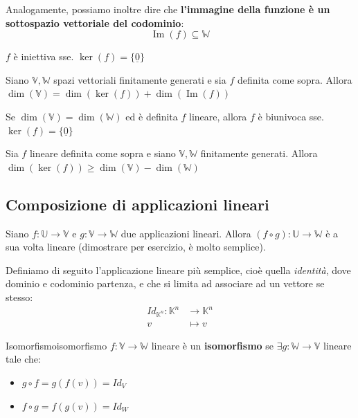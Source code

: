 \documentclass[12pt]{report}
\newcommand{\K}{\mathbb{K}}
\newcommand{\V}{\mathbb{V}}
\newcommand{\W}{\mathbb{W}}
\newcommand{\vectorspace}[1]{\mathbb{#1}}
\newcommand{\nullvector}{\underline{0}}
\begin{document}
	Analogamente, possiamo inoltre dire che \textbf{l'immagine della funzione è un sottospazio vettoriale del codominio}:
	\[
	\operatorname{Im}(f) \subseteq \W
	\]
	
	\begin{proposizione}{}{}
		$f$ è iniettiva sse. $\ker(f) = \{\nullvector\}$
	\end{proposizione}
	
	\begin{proposizione}{}{}
		Siano $\V, \W$ spazi vettoriali finitamente generati e sia $f$ definita come sopra.
		Allora $\dim(\V) = \dim(\ker(f)) + \dim(\operatorname{Im}(f))$
	\end{proposizione}
	
	\begin{corollario}{}{}
		Se $\dim(\V) = \dim(\W)$ ed è definita $f$ lineare, allora $f$ è biunivoca sse. $\ker(f) = \{\nullvector\}$
	\end{corollario}
	
	\begin{corollario}{}{}
		Sia $f$ lineare definita come sopra e siano $\V, \W$ finitamente generati.
		Allora $\dim(\ker(f)) \geq \dim(\V) - \dim(\W)$
	\end{corollario}
	
	\subsection{Composizione di applicazioni lineari}
	Siano $f: \vectorspace{U} \to \V$ e $g: \V \to \W$ due applicazioni lineari. Allora $(f \circ g): \vectorspace{U} \to \W$ è a sua volta lineare (dimostrare per esercizio, è molto semplice).
	
	Definiamo di seguito l'applicazione lineare più semplice, cioè quella \textit{identità}, dove dominio e codominio partenza, e che si limita ad associare ad un vettore se stesso:
	\[
	\begin{aligned}
		Id_{\K^n}: \K^n &\to \K^n\\
		v &\mapsto v
	\end{aligned}
	\]
	
	\begin{definizione}{Isomorfismo}{isomorfismo}
		$f: \V \to \W$ lineare è un \textbf{isomorfismo} se $\exists g: \W \to \V$ lineare tale che:
		\begin{itemize}
			\item $g \circ f = g(f(v)) = Id_V$
			\item $f \circ g = f(g(v)) = Id_W$
		\end{itemize}
	\end{definizione}
	
\end{document}
